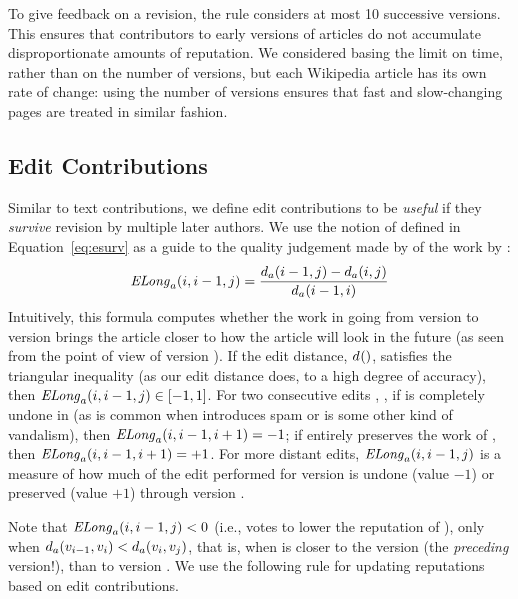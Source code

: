 To give feedback on a revision, the rule considers at most 10
successive versions. 
This ensures that contributors to early versions of articles do not
accumulate disproportionate amounts of reputation. 
We considered basing the limit on time, rather than on the number of
versions, but each Wikipedia article has its own rate of change:
using the number of versions ensures that fast and
slow-changing pages are treated in similar fashion.

\subsection{Edit Contributions}

Similar to text contributions, we define edit contributions to
be \textit{useful} if they \textit{survive} revision by multiple
later authors.
We use the notion of  defined in
Equation~\ref{eq:esurv} as a guide to the quality judgement
made by  of the work by :
\begin{equation*}
\mathit{ELong}_{a}(i,i-1,j) = \frac{d_{a}(i-1,j) - d_{a}(i,j)}
                        {d_{a}(i-1,i)}
\end{equation*}
Intuitively, this formula computes whether the work in going
from version  to version  brings the
article closer to how the article will look in the future
(as seen from the point of view of version ).
If the edit distance, $d_{}()$,
satisfies the triangular inequality (as our edit distance
does, to a high degree of accuracy), then $\mathit{ELong}_{a}(i,i-1,j) \in [-1,1]$.  
For two consecutive edits , ,
if  is completely undone in 
(as is common when  introduces spam or is some other
kind of vandalism), then $\mathit{ELong}_{a}(i,i-1,i+1) = -1$; 
if  entirely preserves the work of ,
then $\mathit{ELong}_{a}(i,i-1,i+1) = +1$.
For more distant edits, $\mathit{ELong}_{a}(i,i-1,j)$ is a measure of how much of the
edit performed for version 
is undone (value $-1$) or preserved (value $+1$) through version . 

Note that $\mathit{ELong}_{a}(i,i-1,j) < 0$ (i.e., 
votes to lower the reputation of ), only when
$d_{a}(v_{i-1},v_{i}) < d_{a}(v_{i},v_{j})$,
that is,
when  is closer to the version 
(the \textit{preceding} version!), than to version .
We use the following rule for updating reputations based on
edit contributions.

